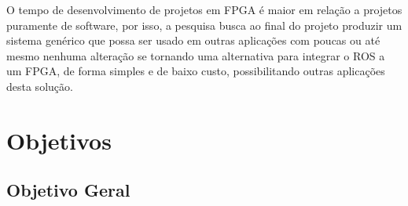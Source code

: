 



O tempo de desenvolvimento de projetos em FPGA é maior em relação a projetos puramente de 
software, por isso, a pesquisa busca ao final do projeto produzir um sistema genérico que possa 
ser usado em outras aplicações com poucas ou até mesmo nenhuma alteração se tornando uma 
alternativa para integrar o ROS a um FPGA, de forma simples e de baixo custo, possibilitando 
outras aplicações desta solução.

\section{Objetivos}

\subsection{Objetivo Geral}

